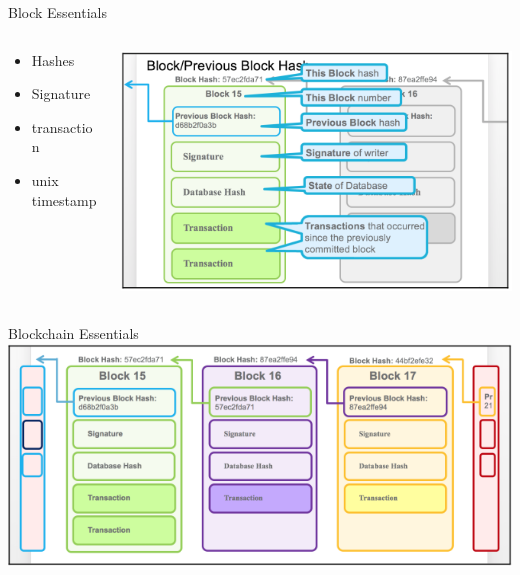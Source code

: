 \documentclass[pdf,table]{beamer}
\begin{document}
\begin{frame}{Block Essentials}
	\begin{columns}[T]
		\begin{column}{0.48\textwidth}
			\begin{itemize}
				\item Hashes 
				\item Signature
				\item transaction
				\item unix timestamp
			\end{itemize}
		\end{column}
		\begin{column}{0.48\textwidth}
			\includegraphics[scale=0.45]{blockEssential}
		\end{column}
	\end{columns}	
\end{frame}

\begin{frame}{Blockchain Essentials}
	\includegraphics[scale=0.5]{blocks}

\end{frame}
\end{document}
